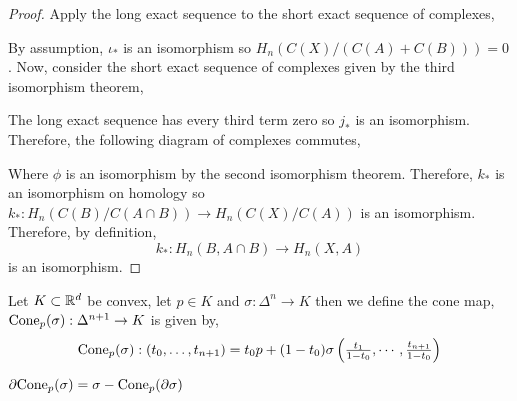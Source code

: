 \documentclass[12pt]{extarticle}
\begin{document}
\begin{proof}
Apply the long exact sequence to the short exact sequence of complexes,

\begin{center}
\end{center}

By assumption, $\iota_{*}$ is an isomorphism so $H_n(C(X)/(C(A) + C(B))) = 0$. Now, consider the short exact sequence of complexes given by the third isomorphism theorem,

\begin{center}
\end{center}
The long exact sequence has every third term zero so $j_*$ is an isomorphism. Therefore, the following diagram of complexes commutes,

\begin{center}
\end{center}
Where $\phi$ is an isomorphism by the second isomorphism theorem. Therefore, $k_{*}$ is an isomorphism on homology so $k_{*} : H_n(C(B)/C(A \cap B)) \to H_n(C(X)/C(A))$ is an isomorphism. Therefore, by definition,
\[ k_* : H_n(B, A \cap B) \to H_n(X, A)\]
is an isomorphism.
\end{proof}

\begin{definition}
Let $K \subset \mathbb{R}^d$ be convex, let $p \in K$ and $\sigma : \Delta^n \to K$ then we define the cone map, $\mathrm{Cone}_p(\sigma) : \Delta^{n+1} \to K$ is given by, 
\[\mathrm{Cone}_p(\sigma) : (t_0, \dots, t_{n+1}) = t_0 p + (1 - t_0) \sigma\left(\tfrac{t_1}{1-t_0}, \cdots, \tfrac{t_{n+1}}{1-t_0} \right)\]
\end{definition}

\begin{lemma}
$\partial \mathrm{Cone}_p(\sigma) = \sigma - \mathrm{Cone}_p(\partial \sigma)$
\end{lemma}
\end{document}
